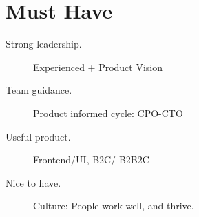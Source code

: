 \section*{Must Have}

\begin{description}
 \item[Strong leadership.] Experienced + Product Vision
  \item[Team guidance.] Product informed cycle: CPO-CTO
 \item[Useful product.] Frontend/UI, B2C/%
B2B2C
 \\
  \item[Nice to have.]
 Culture: People work well, %
 and thrive.
\end{description}




% 










%
